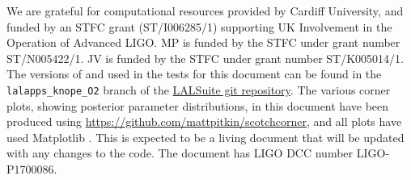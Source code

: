 \acknowledgements

We are grateful for computational resources provided by Cardiff University, and funded by an STFC grant (ST/I006285/1) supporting UK Involvement in
the Operation of Advanced LIGO. MP is funded by the STFC under grant number ST/N005422/1. JV is funded by the STFC under grant number ST/K005014/1. The versions of \lppenf and \lppef used in the tests for this document
can be found in the {\tt lalapps\_knope\_O2} branch of the \href{https://github.com/lscsoft/lalsuite/tree/lalapps_knope_O2}{LALSuite git repository}. The various
corner plots, showing posterior parameter distributions, in this document have been produced using \url{https://github.com/mattpitkin/scotchcorner}, and all
plots have used Matplotlib \citet{Hunter:2007,michael_droettboom_2017_248351}.
This is expected
to be a living document that will be updated with any changes to the code. The document has LIGO DCC number LIGO-P1700086.
